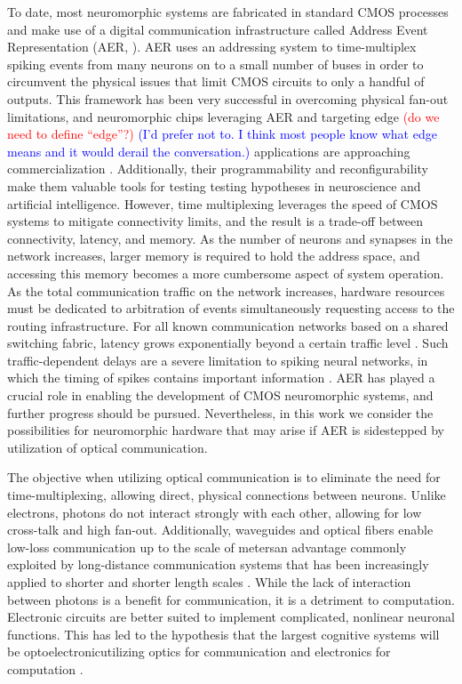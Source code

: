 \documentclass[twocolumn]{article}
\begin{document}
To date, most neuromorphic systems are fabricated in standard CMOS processes and make use of a digital communication infrastructure called Address Event Representation (AER, \cite{bo2000,payu2017, young2019review}). AER uses an addressing system to time-multiplex spiking events from many neurons on to a small number of buses in order to circumvent the physical issues that limit CMOS circuits to only a handful of outputs. This framework has been very successful in overcoming physical fan-out limitations, and neuromorphic chips leveraging AER and targeting edge \textcolor{red}{(do we need to define ``edge''?)} \textcolor{blue}{(I'd prefer not to. I think most people know what edge means and it would derail the conversation.)} applications are approaching commercialization \cite{merolla2014million, davies2018loihi}. Additionally, their programmability and reconfigurability make them valuable tools for testing testing hypotheses in neuroscience and artificial intelligence. However, time multiplexing leverages the speed of CMOS systems to mitigate connectivity limits, and the result is a trade-off between connectivity, latency, and memory. As the number of neurons and synapses in the network increases, larger memory is required to hold the address space, and accessing this memory becomes a more cumbersome aspect of system operation. As the total communication traffic on the network increases, hardware resources must be dedicated to arbitration of events simultaneously requesting access to the routing infrastructure. For all known communication networks based on a shared switching fabric, latency grows exponentially beyond a certain traffic level \cite{hepa2011}. Such traffic-dependent delays are a severe limitation to spiking neural networks, in which the timing of spikes contains important information \cite{panzeri2001role}. AER has played a crucial role in enabling the development of CMOS neuromorphic systems, and further progress should be pursued. Nevertheless, in this work we consider the possibilities for neuromorphic hardware that may arise if AER is sidestepped by utilization of optical communication.

The objective when utilizing optical communication is to eliminate the need for time-multiplexing, allowing direct, physical connections between neurons. Unlike electrons, photons do not interact strongly with each other, allowing for low cross-talk and high fan-out. Additionally, waveguides and optical fibers enable low-loss communication up to the scale of meters\textemdash an advantage commonly exploited by long-distance communication systems that has been increasingly applied to shorter and shorter length scales \cite{miller2017attojoule}. While the lack of interaction between photons is a benefit for communication, it is a detriment to computation. Electronic circuits are better suited to implement complicated, nonlinear neuronal functions. This has led to the hypothesis that the largest cognitive systems will be optoelectronic\textemdash utilizing optics for communication and electronics for computation \cite{shainline2019superconducting}. 
\end{document}
